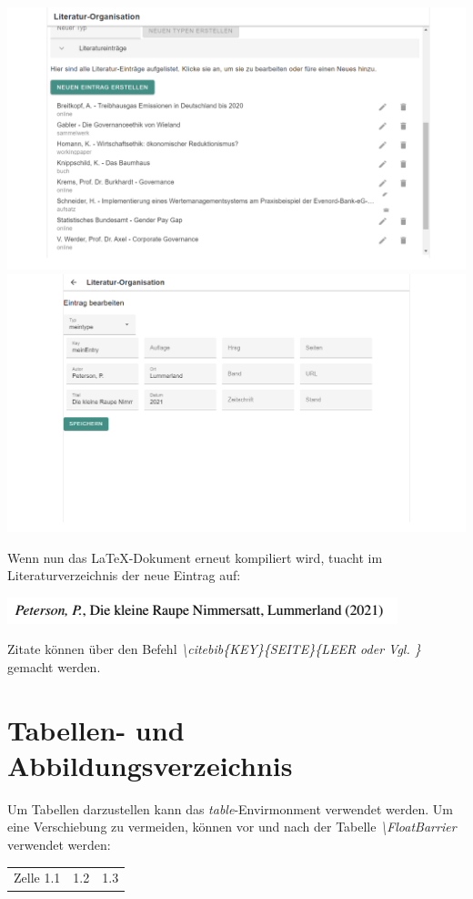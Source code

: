 \documentclass[12pt]{article}
\begin{document}
\begin{center}
\includegraphics[width=\textwidth]{dokuImages/gui2.png}
\includegraphics[width=\textwidth]{dokuImages/gui_4.png}
\end{center}
Wenn nun das LaTeX-Dokument erneut kompiliert wird, tuacht im Literaturverzeichnis der neue Eintrag auf:
\begin{center}
\includegraphics[width=\textwidth]{dokuImages/litentry.png}
\end{center}
Zitate können über den Befehl \textit{\textbackslash citebib\{KEY\}\{SEITE\}\{LEER oder Vgl. \}} gemacht werden.

\part{Tabellen- und Abbildungsverzeichnis}
Um Tabellen darzustellen kann das \textit{table}-Envirmonment verwendet werden. Um eine Verschiebung zu vermeiden, können vor und nach der Tabelle \textit{\textbackslash FloatBarrier} verwendet werden:
\FloatBarrier
\begin{table}[!ht]
\begin{tabular}{|p{3cm}|l|l|}
Zelle 1.1 & 1.2 & 1.3\\
\end{tabular}
\end{table}
\FloatBarrier
\end{document}
